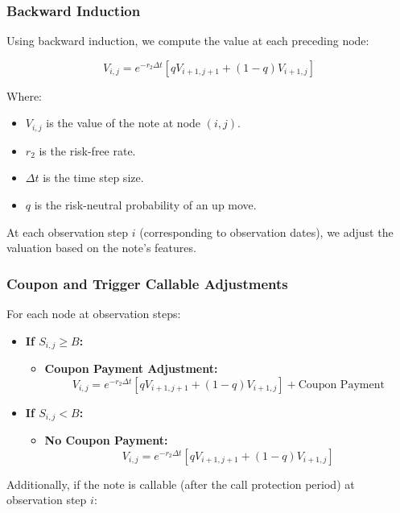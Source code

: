 \documentclass[12pt,a4paper]{article}
\begin{document}
\subsubsection*{Backward Induction}

Using backward induction, we compute the value at each preceding node:

\[
V_{i,j} = e^{-r_2 \Delta t} \left[ q V_{i+1,j+1} + (1 - q) V_{i+1,j} \right]
\]

Where:

\begin{itemize}
    \item \( V_{i,j} \) is the value of the note at node \( (i, j) \).
    \item \( r_2 \) is the risk-free rate.
    \item \( \Delta t \) is the time step size.
    \item \( q \) is the risk-neutral probability of an up move.
\end{itemize}

At each observation step \( i \) (corresponding to observation dates), we adjust the valuation based on the note's features.

\subsubsection*{Coupon and Trigger Callable Adjustments}

For each node at observation steps:

\begin{itemize}
    \item \textbf{If \( S_{i,j} \geq B \):}
    \begin{itemize}
        \item \textbf{Coupon Payment Adjustment:}
        \[
        V_{i,j} = e^{-r_2 \Delta t} \left[ q V_{i+1,j+1} + (1 - q) V_{i+1,j} \right] + \text{Coupon Payment}
        \]
    \end{itemize}
    \item \textbf{If \( S_{i,j} < B \):}
    \begin{itemize}
        \item \textbf{No Coupon Payment:}
        \[
        V_{i,j} = e^{-r_2 \Delta t} \left[ q V_{i+1,j+1} + (1 - q) V_{i+1,j} \right]
        \]
    \end{itemize}
\end{itemize}

Additionally, if the note is callable (after the call protection period) at observation step \( i \):
\end{document}

